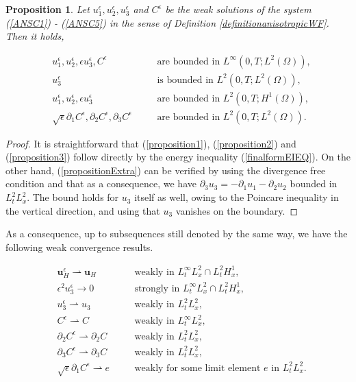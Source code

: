 \documentclass[11pt]{article}
\newtheorem{prop}{Proposition}
\begin{document}
  \begin{prop}
    Let $u^\epsilon_1, u^\epsilon_2, u^\epsilon_3$ and $C^\epsilon$ be the weak solutions of the system (\ref{ANSC1}) - (\ref{ANSC5}) in the sense of Definition \ref{definitionanisotropicWF}. Then it holds,
    
    \begin{align}
      & u^\epsilon_1, u^\epsilon_2, \epsilon u^\epsilon_3, C^\epsilon & \quad & \text{are bounded in $L^\infty (0,T; L^2(\Omega)),$} \label{proposition1} \\
      & u^\epsilon_3 & \quad & \text{is bounded in $L^2 (0,T; L^2(\Omega)),$} \label{propositionExtra} \\
      & u^\epsilon_1, u^\epsilon_2, \epsilon u^\epsilon_3 & \quad & \text{are bounded in $L^2(0,T; H^1(\Omega)),$} \label{proposition2} \\
      & \sqrt{\epsilon} \partial_1 C^\epsilon, \partial_2 C^\epsilon, \partial_3 C^\epsilon & \quad & \text{are bounded in $L^2(0,T;L^2(\Omega)).$} \label{proposition3}
    \end{align}
    
  \end{prop}
  
  \begin{proof}
  It is straightforward that (\ref{proposition1}), (\ref{proposition2}) and (\ref{proposition3}) follow directly by the energy inequality (\ref{finalformEIEQ}). On the other hand, (\ref{propositionExtra}) can be verified by using the divergence free condition and that as a consequence, we have $\partial_3 u_3 = - \partial_1 u_1 - \partial_2 u_2$ bounded in $L^2_t L^2 _x$. The bound holds for $u_3$ itself as well, owing to the Poincare inequality in the vertical direction, and using that $u_3$ vanishes on the boundary.
  \end{proof}
  
  As a consequence, up to subsequences still denoted by the same way, we have the following weak convergence results.
  
  \begin{align} 
    &  \mathbf{u}_H^\epsilon \rightharpoonup \mathbf{u}_H &\quad & \text{weakly in $L_t^\infty L_x^2 \cap L_t^2 H_x^1$,} \label{WeakConvUHEps} \\
    &  \epsilon^2 u_3^\epsilon \to 0 &\quad & \text{strongly in $L_t^\infty L_x^2 \cap L_t^2 H_x^1$,} \label{WeakConvU3Eps} \\ 
    & u_3^\epsilon \rightharpoonup u_3  &\quad & \text{weakly in $L_t^2 L_x^2$,} \label{WeakConvU3NoEps} \\
    & C^\epsilon \rightharpoonup C &\quad & \text{weakly in $L_t^\infty L_x^2$,} \label{WeakConvCEps1} \\
    & \partial_2 C^\epsilon \rightharpoonup \partial_2 C &\quad & \text{weakly in $L_t^2 L_x^2$,} \label{WeakConvCEps2} \\
    & \partial_3 C^\epsilon \rightharpoonup \partial_3 C &\quad & \text{weakly in $L_t^2 L_x^2$,} \label{WeakConvCEps3} \\
    & \sqrt{\epsilon} \partial_1 C^\epsilon \rightharpoonup e &\quad & \text{weakly for some limit element $e$ in $L_t^2 L_x^2$.} \label{WeakConvCEps4}
  \end{align} 
\end{document}
